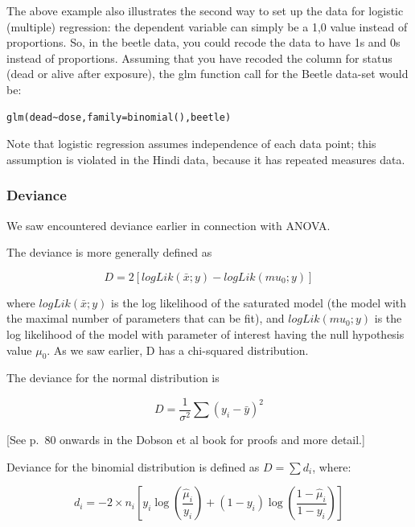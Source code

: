 \documentclass[
  12pt,
]{krantz}
\theoremstyle{definition}
\theoremstyle{definition}
\theoremstyle{definition}
\theoremstyle{definition}
\theoremstyle{remark}
\begin{document}
The above example also illustrates the second way to set up the data for logistic (multiple) regression: the dependent variable can simply be a 1,0 value instead of proportions. So, in the beetle data, you could recode the data to have 1s and 0s instead of proportions. Assuming that you have recoded the column for status (dead or alive after exposure), the glm function call for the Beetle data-set would be:

\begin{verbatim}
glm(dead~dose,family=binomial(),beetle)
\end{verbatim}

Note that logistic regression assumes independence of each data point; this assumption is violated in the Hindi data, because it has repeated measures data.

\hypertarget{deviance}{%
\subsubsection{Deviance}\label{deviance}}

We saw encountered deviance earlier in connection with ANOVA.

The deviance is more generally defined as

\begin{equation}
D = 2[logLik(\bar{x}; y) - logLik(mu_0; y)]
\end{equation}

\noindent
where \(logLik(\bar{x}; y)\) is the log likelihood of the saturated model (the model with the maximal number of parameters that can be fit), and \(logLik(mu_0; y)\) is the log likelihood of the model with parameter of interest having the null hypothesis value \(\mu_0\).
As we saw earlier, D has a chi-squared distribution.

The deviance for the normal distribution is

\begin{equation}
D = \frac{1}{\sigma^2}\sum (y_i - \bar{y})^2
\end{equation}

{[}See p.~80 onwards in the Dobson et al book for proofs and more detail.{]}

Deviance for the binomial distribution is defined as \(D=\sum d_i\), where:

\begin{equation}
d_i = -2 \times n_i [ y_i \log\left(\frac{\hat{\mu}_i}{y_i}\right) + (1-y_i) \log \left(\frac{1-\hat{\mu}_i}{1-y_i}\right) ]  
\end{equation}
\end{document}
